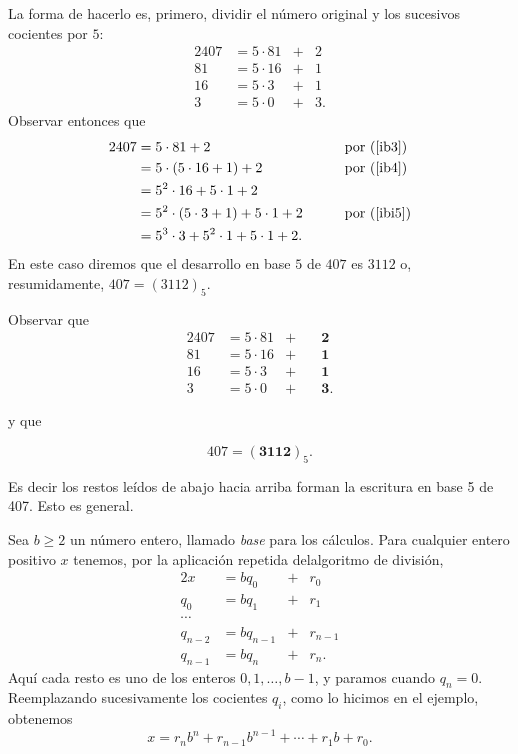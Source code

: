 \documentclass[handout]{beamer} %
\begin{document}
	
	\begin{frame}
		La forma de hacerlo  es, primero, dividir el número original y los sucesivos cocientes por $5$:   \pause
		\begin{alignat}2
			407 &=5\cdot 81 &+& 2 \label{ib3}\\
			81 & = 5\cdot 16 &+& 1  \label{ib4}\\
			16 & = 5\cdot 3 &+& 1  \label{ibi5}\\
			3 & = 5\cdot 0 &+& 3.
		\end{alignat} \pause
		Observar entonces que
		\begin{alignat*}2
			407 &=5\cdot 81 + 2  &\qquad& \text{por (\ref{ib3})}\\
			&= 5\cdot (5\cdot 16 + 1) + 2  &\qquad& \text{por (\ref{ib4})}\\
			&= 5^2 \cdot 16+ 5\cdot 1 + 2 &\qquad& \text{}\\
			&= 5^2 \cdot (5\cdot 3 + 1)+ 5\cdot 1 + 2   &\qquad& \text{por (\ref{ibi5})}\\
			&= 5^3 \cdot 3+ 5^2 \cdot 1 + 5\cdot 1 + 2.  &\qquad& \text{}
		\end{alignat*} \pause
		En este caso diremos que el desarrollo en base $5$ de $407$ es $3112$ o, resumidamente, $407 = (3112)_5$.  
	\end{frame}
	
	
	\begin{frame}
		Observar que 
		\begin{alignat*}2
			407 &=5\cdot 81 &+\quad& \textbf{2} \\
			81 & = 5\cdot 16 &+\quad& \textbf{1} \\
			16 & = 5\cdot 3 &+\quad& \textbf{1}  \\
			3 & = 5\cdot 0 &+\quad& \textbf{3}.
		\end{alignat*} \pause
		
		y  que 
		
		$$407 = (\textbf{3112})_5.$$ 
		\pause
		
		Es decir los restos leídos de abajo hacia arriba forman la escritura en base 5 de 407. Esto es general. 
	\end{frame}
	
	\begin{frame}
		Sea
		$b \ge 2$ un número entero, llamado {\em base} para los cálculos.
		Para cualquier entero positivo $x$ tenemos, por la aplicación
		repetida delalgoritmo de división,
		\begin{alignat*}2
			x&=bq_0 &+& r_0 \\
			q_0 & = bq_1 &+&r_1 \\
			\cdots & \\
			q_{n-2} & = bq_{n-1} &+&r_{n-1} \\
			q_{n-1} & = bq_n &+&r_n.
		\end{alignat*}
		Aquí cada resto es uno de los enteros $0, 1,\ldots,b-1$, y paramos
		cuando $q_n=0$. Reemplazando sucesivamente los cocientes $q_i$, como lo hicimos en el ejemplo, obtenemos
		$$
		x=r_nb^n +r_{n-1} b^{n-1}+\cdots + r_1 b + r_0.
		$$
	\end{frame}
	
\end{document}
